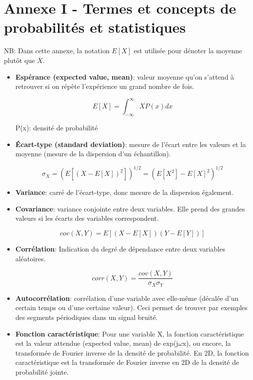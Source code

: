 \documentclass[]{article}
\begin{document}
\section*{Annexe I - Termes et concepts de probabilités et
statistiques}\label{AnnexeI}

NB: Dans cette annexe, la notation \(E[X]\) est utilisée pour dénoter la
moyenne plutôt que \(\overline{X}\).

\begin{itemize}
\item
  \textbf{Espérance (expected value, mean)}: valeur moyenne qu'on
  s'attend à retrouver si on répète l'expérience un grand nombre de
  fois.

  \[
  E[X] = \int_{-\infty}^{\infty}X P(x) dx
  \]

  P(x): densité de probabilité\\
\item
  \textbf{Écart-type (standard deviation)}: mesure de l'écart entre les
  valeurs et la moyenne (mesure de la dispersion d'un échantillon).

  \[
  \sigma_X = \left(E[(X - E[X])^2]\right)^{1/2} = \left(E[X^2]-E[X]^2\right)^{1/2}
  \]
\item
  \textbf{Variance}: carré de l'écart-type, donc mesure de la dispersion
  également.\\
\item
  \textbf{Covariance}: variance conjointe entre deux variables. Elle
  prend des grandes valeurs si les écarts des variables correspondent.

  \[
  cov(X,Y) = E[(X-E[X])(Y-E[Y])]
  \]
\item
  \textbf{Corrélation}: Indication du degré de dépendance entre deux
  variables aléatoires.

  \[
  corr(X,Y) = \frac{cov(X,Y)}{\sigma_{X}\sigma_{Y}}
  \]
\item
  \textbf{Autocorrélation}: corrélation d'une variable avec elle-même
  (décalée d'un certain temps ou d'une certaine valeur). Ceci permet de
  trouver par exemples des segments périodiques dans un signal bruité.\\
\item
  \textbf{Fonction caractéristique}: Pour une variable X, la fonction
  caractéristique est la valeur attendue (expected value, mean) de
  exp(j\(\omega\)x), ou encore, la transformée de Fourier inverse de la
  densité de probabilité. En 2D, la fonction caractéristique est la
  transformée de Fourier inverse en 2D de la densité de probabilité
  jointe.
\end{itemize}
\end{document}
